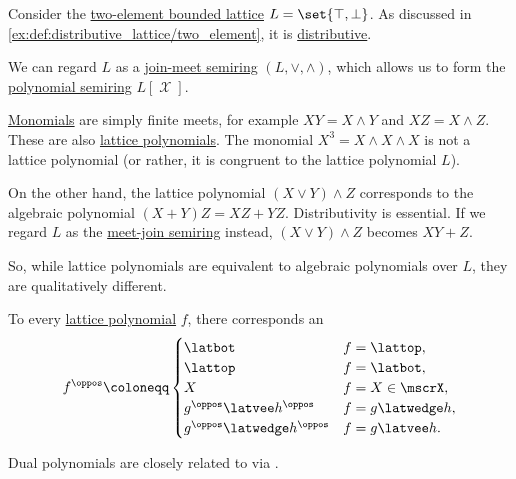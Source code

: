 \begin{remark}\label{rem:algebraic_and_lattice_polynomials}
  Consider the \hyperref[def:bounded_lattice/trivial]{two-element bounded lattice} \( L = \set{ \top, \bot } \). As discussed in \cref{ex:def:distributive_lattice/two_element}, it is \hyperref[def:distributive_lattice]{distributive}.

  We can regard \( L \) as a \hyperref[def:lattice_as_semiring]{join-meet semiring} \( (L, \vee, \wedge) \), which allows us to form the \hyperref[def:polynomial_algebra]{polynomial semiring} \( L[\mscrX] \).

  \hyperref[def:polynomial_algebra/monomials]{Monomials} are simply finite meets, for example \( XY = X \wedge Y \) and \( XZ = X \wedge Z \). These are also \hyperref[def:free_lattice/polynomial]{lattice polynomials}. The monomial \( X^3 = X \wedge X \wedge X \) is not a lattice polynomial (or rather, it is congruent to the lattice polynomial \( L \)).

  On the other hand, the lattice polynomial \( (X \vee Y) \wedge Z \) corresponds to the algebraic polynomial \( (X + Y)Z = XZ + YZ \). Distributivity is essential. If we regard \( L \) as the \hyperref[def:lattice_as_semiring]{meet-join semiring} instead, \( (X \vee Y) \wedge Z \) becomes \( XY + Z \).

  So, while lattice polynomials are equivalent to algebraic polynomials over \( L \), they are qualitatively different.
\end{remark}

\begin{definition}\label{def:dual_lattice_polynomial}\mimprovised
  To every \hyperref[def:free_lattice/polynomial]{lattice polynomial} \( f \), there corresponds an 
  \begin{equation*}
    f^\oppos \coloneqq \begin{cases}
      \latbot                         &f = \lattop, \\
      \lattop                         &f = \latbot, \\
      X                               &f = X \in \mscrX, \\
      g^\oppos \latvee h^\oppos   &f = g \latwedge h, \\
      g^\oppos \latwedge h^\oppos &f = g \latvee h.
    \end{cases}
  \end{equation*}
\end{definition}
\begin{comments}
  \item Dual polynomials are closely related to  via .
\end{comments}


